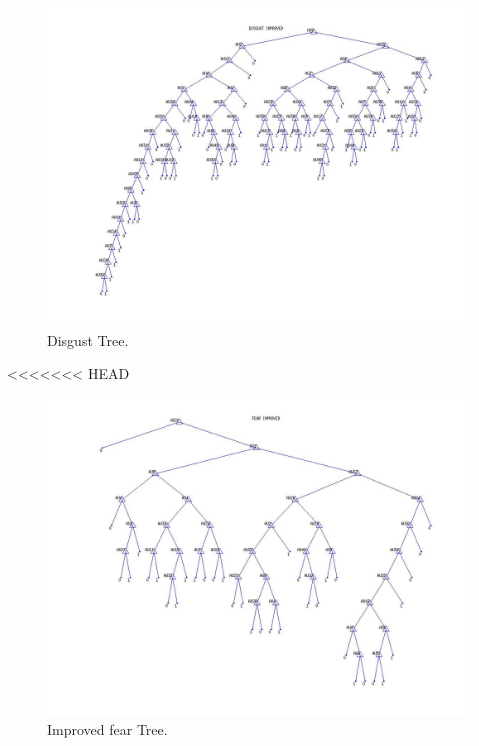 \documentclass[a4paper,12pt,oneside,final]{report}
\newenvironment{changemargin}[2]{\begin{list}{}{%
\setlength{\topsep}{0pt}%
\setlength{\leftmargin}{0pt}%
\setlength{\rightmargin}{0pt}%
\setlength{\listparindent}{\parindent}%
\setlength{\itemindent}{\parindent}%
\setlength{\parsep}{0pt plus 1pt}%
\addtolength{\leftmargin}{#1}%
\addtolength{\rightmargin}{#2}%
}\item }{\end{list}}
\begin{document}
\begin{appendices}
\begin{figure}[!h]
\begin{changemargin}{-20mm}{-20mm}
\center
\includegraphics[scale=0.5]{disgust_improved.jpg}
\caption{Disgust Tree.}
\end{changemargin}
\end{figure}

<<<<<<< HEAD
\begin{figure}[!h]
\begin{changemargin}{-25mm}{-25mm}
\center
\includegraphics[scale=0.5]{fear_improved.jpg}
\caption{Improved fear Tree.}
\end{changemargin}
\end{figure}



\end{appendices}
\end{document}
